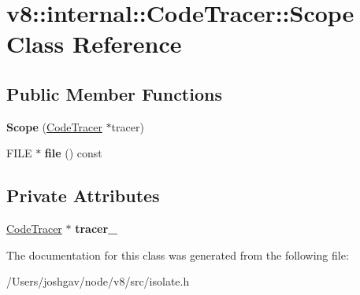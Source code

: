 \hypertarget{classv8_1_1internal_1_1_code_tracer_1_1_scope}{}\section{v8\+:\+:internal\+:\+:Code\+Tracer\+:\+:Scope Class Reference}
\label{classv8_1_1internal_1_1_code_tracer_1_1_scope}
\subsection*{Public Member Functions}
\begin{DoxyCompactItemize}
\item 
{\bfseries Scope} (\hyperlink{classv8_1_1internal_1_1_code_tracer}{Code\+Tracer} $\ast$tracer)\hypertarget{classv8_1_1internal_1_1_code_tracer_1_1_scope_a0475ce5cee4a4d97d8854ae01cad9e6e}{}\label{classv8_1_1internal_1_1_code_tracer_1_1_scope_a0475ce5cee4a4d97d8854ae01cad9e6e}

\item 
F\+I\+LE $\ast$ {\bfseries file} () const \hypertarget{classv8_1_1internal_1_1_code_tracer_1_1_scope_a8c62dcca015ecc9585466c30804aa639}{}\label{classv8_1_1internal_1_1_code_tracer_1_1_scope_a8c62dcca015ecc9585466c30804aa639}

\end{DoxyCompactItemize}
\subsection*{Private Attributes}
\begin{DoxyCompactItemize}
\item 
\hyperlink{classv8_1_1internal_1_1_code_tracer}{Code\+Tracer} $\ast$ {\bfseries tracer\+\_\+}\hypertarget{classv8_1_1internal_1_1_code_tracer_1_1_scope_ab22dbb2a77acdb22f8c05e0ce8e9510f}{}\label{classv8_1_1internal_1_1_code_tracer_1_1_scope_ab22dbb2a77acdb22f8c05e0ce8e9510f}

\end{DoxyCompactItemize}


The documentation for this class was generated from the following file\+:\begin{DoxyCompactItemize}
\item 
/\+Users/joshgav/node/v8/src/isolate.\+h\end{DoxyCompactItemize}
